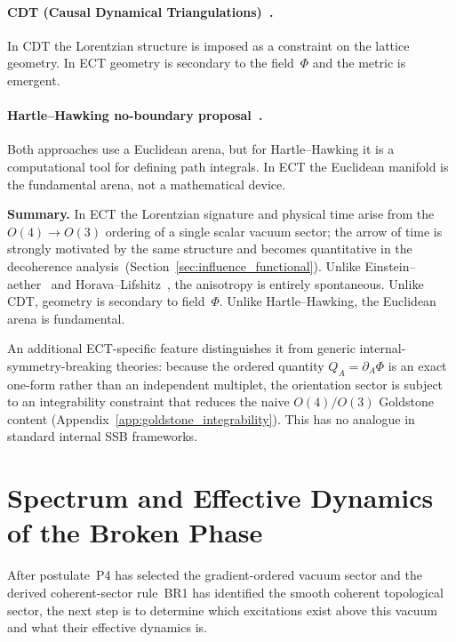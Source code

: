 \documentclass[11pt,a4paper]{article}
\numberwithin{equation}{section}
\begin{document}
\paragraph{CDT (Causal Dynamical Triangulations)~\cite{Ambjorn2005}.}
In CDT the Lorentzian structure is imposed as a constraint on
the lattice geometry. In ECT geometry is secondary to the field~$\Phi$
and the metric is emergent.

\paragraph{Hartle--Hawking no-boundary proposal~\cite{HartleHawking1983}.}
Both approaches use a Euclidean arena, but for Hartle--Hawking it is a
computational tool for defining path integrals. In ECT the Euclidean
manifold is the fundamental arena, not a mathematical device.

\noindent\textbf{Summary.}
In ECT the Lorentzian signature and physical time arise from the
$O(4)\to O(3)$ ordering of a single scalar vacuum sector; the arrow
of time is strongly motivated by the same structure and becomes
quantitative in the decoherence analysis~(Section~\ref{sec:influence_functional}).
Unlike Einstein--aether~\cite{Jacobson2004} and Horava--Lifshitz~\cite{Horava2009}, the anisotropy is
entirely spontaneous. Unlike CDT, geometry is secondary to field~$\Phi$.
Unlike Hartle--Hawking, the Euclidean arena is fundamental.

An additional ECT-specific feature distinguishes it from generic
internal-symmetry-breaking theories: because the ordered quantity
$Q_A=\partial_A\Phi$ is an exact one-form rather than an independent
multiplet, the orientation sector is subject to an integrability
constraint that reduces the naive $O(4)/O(3)$ Goldstone content
(Appendix~\ref{app:goldstone_integrability}).  This has no analogue
in standard internal SSB frameworks.


\section{Spectrum and Effective Dynamics of the Broken Phase}
\label{sec:broken_spectrum}

After postulate~P4 has selected the gradient-ordered vacuum sector
and the derived coherent-sector rule~BR1 has identified the smooth
coherent topological sector, the next step is to determine which
excitations exist above this vacuum and what their effective dynamics is.
\end{document}
